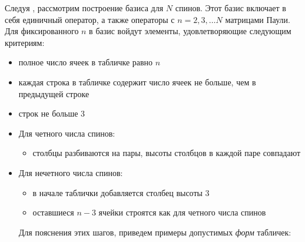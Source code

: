 \documentclass[]{article}
\renewcommand{\[}{\begin{equation}}
\renewcommand{\]}{\end{equation}}
\begin{document}
Следуя \cite{sourceArticle}, рассмотрим построение базиса для $N$ спинов. Этот базис включает в себя единичный оператор, а также операторы с $n=2,3,\dots N$ матрицами Паули. Для фиксированного $n$ в базис  войдут элементы, удовлетворяющие следующим критериям:
\begin{itemize}
    \item полное число ячеек в табличке равно $n$
	\item каждая строка в табличке содержит число ячеек не больше, чем в предыдущей строке
	\item строк не больше 3
	\item Для четного числа спинов:
	\begin{itemize}
		\item столбцы разбиваются на пары, высоты столбцов в каждой паре совпадают
	\end{itemize}
	\item Для нечетного числа спинов:
	\begin{itemize}
		\item в начале таблички добавляется столбец высоты 3
		\item оставшиеся $n-3$ ячейки строятся как для четного числа спинов
	\end{itemize}


Для пояснения этих шагов, приведем примеры допустимых {\it форм} табличек:
	

\end{itemize}
\end{document}
